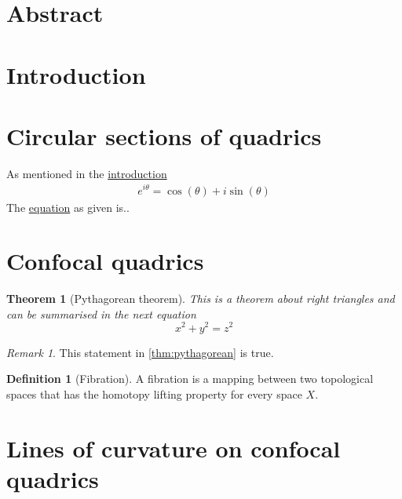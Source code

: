 \documentclass[12pt,a4paper]{article}
\newtheorem{theorem}{Theorem}[section]
\theoremstyle{definition}
\newtheorem{definition}{Definition}[section]
\theoremstyle{remark}
\newtheorem{remark}{\textit{Remark}}[section]
\theoremstyle{definition}
\begin{document}
\pagestyle{fancy}
\section*{Abstract} \label{sec:abstract}
\pagebreak
\pagestyle{tocstyle}
\renewcommand{\contentsname}{Contents}
\tableofcontents
\pagebreak
\listoffigures
\pagebreak
\pagestyle{fancy}
\section{Introduction} \label{sec:introduction}
\pagebreak
\section{Circular sections of quadrics}
As mentioned in the \hyperref[sec:introduction]{introduction}
\begin{align} \label{eq:Euler}
    e^{i \theta} = \cos(\theta)+i\sin(\theta)
\end{align}
The \hyperref[eq:Euler]{equation} as given is..
\pagebreak
\section{Confocal quadrics}
\begin{theorem}[Pythagorean theorem]
\label{thm:pythagorean}
This is a theorem about right triangles and can be summarised in the next
equation
\[ x^2 + y^2 = z^2 \]
\end{theorem}
\begin{remark}
This statement in \autoref{thm:pythagorean} is true.
\end{remark}

\begin{definition}[Fibration]
\label{def:fibration}
A fibration is a mapping between two topological spaces that has the homotopy lifting property for every space \(X\).
\end{definition}
\pagebreak
\section{Lines of curvature on confocal quadrics}
\pagebreak
\end{document}
